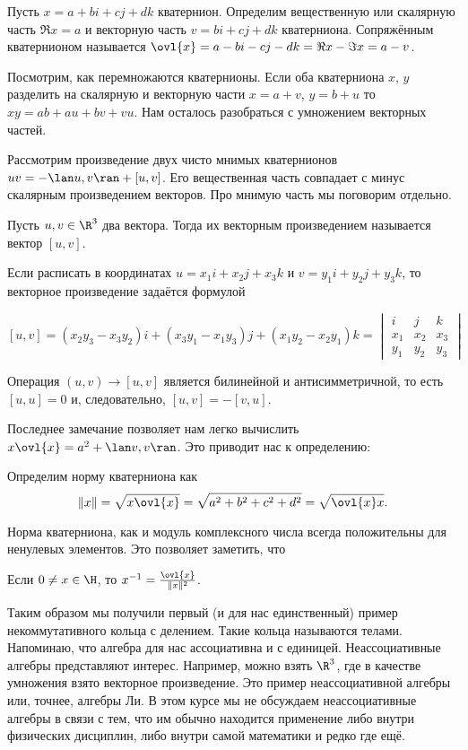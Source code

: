  Пусть $x= a+bi+cj+dk$ кватернион. Определим вещественную или скалярную часть $\Re x=a$ и векторную часть $v= bi+cj+dk$ кватерниона. Сопряжённым кватернионом называется $\ovl{x}= a-bi-cj-dk= \Re x - \Im x =a-v$. 
\edfn



Посмотрим, как перемножаются кватернионы. Если оба кватерниона  $x$, $y$ разделить на скалярную и векторную части $x=a+v$, $y=b+u$ то $xy=ab+au+bv+ vu$. Нам осталось разобраться с умножением векторных частей. 

Рассмотрим произведение двух чисто мнимых кватернионов $uv=-\lan u,v\ran+[u,v]$. Его вещественная часть совпадает с минус скалярным произведением векторов. Про мнимую часть мы поговорим отдельно.

 Пусть $u,v \in \R^3$ два вектора. Тогда их векторным произведением называется вектор $[u,v]$.
\edfn

Если расписать в координатах $u=x_1i+x_2j+x_3k$ и  $v=y_1i+y_2j+y_3k$, то векторное произведение задаётся формулой

$$[u,v]= (x_2y_3-x_3y_2)i + (x_3y_1-x_1y_3)j + (x_1y_2- x_2y_1)k= \begin{vmatrix} i& j&k \\ x_1 & x_2 & x_3 \\ y_1 & y_2 & y_3 \end{vmatrix} $$

\rm Операция $(u,v) \to [u,v]$ является билинейной и антисимметричной, то есть $[u,u]=0$ и, следовательно, $[u,v]=-[v,u]$.
\erm

Последнее замечание позволяет нам легко вычислить $x \ovl{x}= a^2+ \lan v,v \ran$. Это приводит нас к определению:

 Определим норму кватерниона как $$\|x\|=\sqrt{x\ovl{x}}=\sqrt{ a^2+b^2+c^2+d^2}=\sqrt{\ovl{x}x}.$$
\edfn 


Норма кватерниона, как и модуль комплексного числа всегда положительны для ненулевых элементов. Это позволяет заметить, что

 Если $0\neq x \in \H$, то $x^{-1}=\frac{\ovl{x}}{\|x\|^2}$. 
\edfn

Таким образом мы получили первый (и для нас единственный) пример некоммутативного кольца с делением. Такие кольца называются телами. Напоминаю, что алгебра для нас ассоциативна и с единицей. Неассоциативные алгебры представляют интерес. Например, можно взять $\R^3$, где в качестве умножения взято векторное произведение. Это пример неассоциативной алгебры или, точнее, алгебры Ли. В этом курсе мы не  обсуждаем неассоциативные алгебры в связи с тем, что им обычно находится применение либо внутри физических дисциплин, либо внутри самой математики и редко где ещё. 


